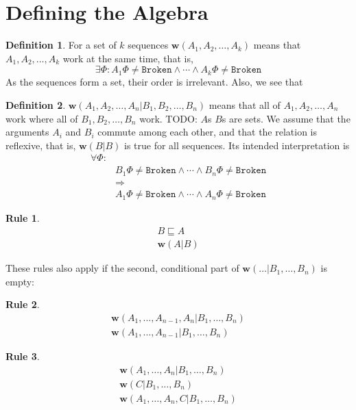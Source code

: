 \documentclass[12pt]{article}
\newcommand{\fsbroken}{\mathtt{Broken}} %
\newcommand{\FS}{\Phi} %
\newcommand{\eqext}{\sqsubseteq}
\newcommand{\works}[1]{{\mathbf{w}}({#1})}
\newcommand{\worksc}[2]{{\mathbf{w}}({#1}|{#2})}
\newcommand{\infer}[2]{\begin{array}{c}{#1}\\\hline{#2}\end{array}}
\newcommand{\inferr}[3]{\begin{array}{c}{#1}\\{#2}\\\hline{#3}\end{array}}
\theoremstyle{definition}
\newtheorem{mydef}{Definition}
\newtheorem{myrul}{Rule}
\begin{document}
\section{Defining the Algebra}





\begin{mydef}
For a set of $k$ sequences
$\works{A_1,A_2,\ldots,A_k}$ means that 
$A_1,A_2,\ldots,A_k$ work at the same time, that is,
\[\exists \FS: A_1\FS\neq\fsbroken \wedge \cdots \wedge A_k\FS\neq\fsbroken\]
As the sequences form a set, their order is irrelevant.
Also, we see that 
\end{mydef}

\begin{mydef}
$\worksc{A_1,A_2,\ldots,A_n}{B_1,B_2,\ldots,B_n}$ means that 
all of $A_1,A_2,\ldots,A_n$ work where all of $B_1,B_2,\ldots,B_n$ work.
TODO: $A$s $B$s are sets.
We assume that the arguments $A_i$ and $B_i$ commute among each other,
and that the relation is reflexive, that is, $\worksc{B}{B}$ is true for all sequences.
Its intended interpretation is
\begin{align*}
\forall \FS:&\\ 
&B_1\FS\neq\fsbroken \wedge \cdots \wedge B_n\FS\neq\fsbroken\\
&\Rightarrow\\
&A_1\FS\neq\fsbroken \wedge \cdots \wedge A_n\FS\neq\fsbroken
\end{align*}
\end{mydef}





\begin{myrul}\label{r_ex_w}
\[\infer{B\eqext A}{\worksc{A}{B}}\]
\end{myrul}

These rules also apply if the second, conditional part of $\worksc{\ldots}{B_1,\ldots,B_n}$ is empty:

\begin{myrul}
\[\infer{\worksc{A_1,\ldots,A_{n-1},A_n}{B_1,\ldots,B_n}}{\worksc{A_1,\ldots,A_{n-1}}{B_1,\ldots,B_n}}\]
\end{myrul}

\begin{myrul}\label{r_w_combine}
\[\inferr{\worksc{A_1,\ldots,A_n}{B_1,\ldots,B_n}}{\worksc{C}{B_1,\ldots,B_n}}{\worksc{A_1,\ldots,A_n,C}{B_1,\ldots,B_n}}\]
\end{myrul}
\end{document}
